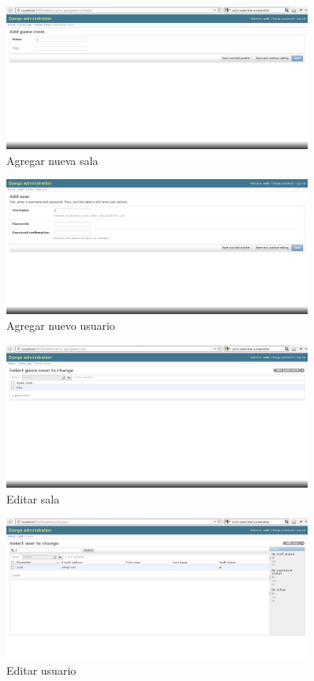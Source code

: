 \documentclass[a4paper,11pt]{article}
\begin{document}
\begin{figure}[h!]
	\centering
	\includegraphics[width=0.9\textwidth]{Admin_addroom.png}
	\caption{Agregar nueva sala}
\end{figure}

\begin{figure}[h!]
	\centering
	\includegraphics[width=0.9\textwidth]{Admin_adduser.png}
	\caption{Agregar nuevo usuario}
\end{figure}

\begin{figure}[h!]
	\centering
	\includegraphics[width=0.9\textwidth]{Admin_room_cp.png}
	\caption{Editar sala}
\end{figure}
\begin{figure}[h!]
	\centering
	\includegraphics[width=0.9\textwidth]{Admin_user_cp.png}
	\caption{Editar usuario}
\end{figure}
\end{document}
